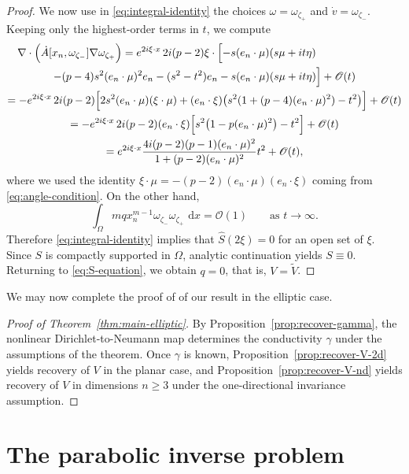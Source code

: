 \documentclass[a4paper,12pt]{article}
\newcommand{\Ord}{\mathscr{O}}
\newcommand{\dd}{\,\mathrm{d}}
\theoremstyle{definition}
\theoremstyle{remark}
\begin{document}
\begin{proof}
We now use in \eqref{eq:integral-identity} the choices $\omega=\omega_{\zeta_+}$ and $\dot v=\omega_{\zeta_-}$. Keeping only the highest-order terms in $t$, we compute
\begin{multline*}
\nabla\cdot\Bigl(\dot A[x_n,\omega_{\zeta_-}]\nabla\omega_{\zeta_+}\Bigr)
=e^{2i\xi\cdot x}\,2i(p-2)\xi\cdot\Bigl[-s(e_n\cdot\mu)(s\mu+it\eta)\hspace{7em}\\
-(p-4)s^2(e_n\cdot\mu)^2e_n-(s^2-t^2)e_n-s(e_n\cdot\mu)(s\mu+it\eta)\Bigr]+\Ord(t)\\
=-e^{2i\xi\cdot x}\,2i(p-2)\Bigl[2s^2(e_n\cdot\mu)(\xi\cdot\mu)
+(e_n\cdot\xi)\bigl(s^2(1+(p-4)(e_n\cdot\mu)^2)-t^2\bigr)\Bigr]+\Ord(t)\\
=-e^{2i\xi\cdot x}\,2i(p-2)(e_n\cdot\xi)
\Bigl[s^2\bigl(1-p(e_n\cdot\mu)^2\bigr)-t^2\Bigr]+\Ord(t)\\
=e^{2i\xi\cdot x}\frac{4i(p-2)(p-1)(e_n\cdot\mu)^2}{1+(p-2)(e_n\cdot\mu)^2}t^2+\Ord(t),
\end{multline*}
where we used the identity $\xi\cdot\mu=-(p-2)(e_n\cdot\mu)(e_n\cdot\xi)$ coming from \eqref{eq:angle-condition}. On the other hand,
\[
\int_\Omega mqx_n^{m-1}\omega_{\zeta_-}\omega_{\zeta_+}\,\dd x=\Ord(1)
\qquad\text{as }t\to\infty.
\]
Therefore \eqref{eq:integral-identity} implies that $\widehat S(2\xi)=0$ for an open set of $\xi$. Since $S$ is compactly supported in $\Omega$, analytic continuation yields $S\equiv0$. Returning to \eqref{eq:S-equation}, we obtain $q=0$, that is, $V=\tilde V$.
\end{proof}

We may now complete the proof of of our result in the elliptic case.

\begin{proof}[Proof of Theorem~\ref{thm:main-elliptic}]
By Proposition~\ref{prop:recover-gamma}, the nonlinear Dirichlet-to-Neumann map determines the conductivity $\gamma$ under the assumptions of the theorem. Once $\gamma$ is known, Proposition~\ref{prop:recover-V-2d} yields recovery of $V$ in the planar case, and Proposition~\ref{prop:recover-V-nd} yields recovery of $V$ in dimensions $n\ge 3$ under the one-directional invariance assumption.
\end{proof}

\section{The parabolic inverse problem}\label{sec:inverse-parabolic}
\end{document}
